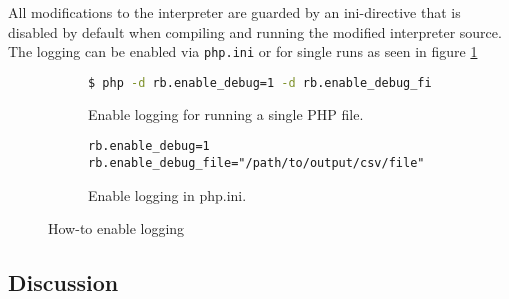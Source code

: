 All modifications to the interpreter are guarded by an ini-directive that is disabled by default when compiling and running the modified interpreter source. The logging can be enabled via \texttt{php.ini} or for single runs as seen in figure \ref{fig:iniDirective}

\begin{figure}[ht]
\centering
\begin{subfigure}{\linewidth}
\begin{lstlisting}[language=bash]
$ php -d rb.enable_debug=1 -d rb.enable_debug_file=<path-to-log-file> <path-to-php-file>
\end{lstlisting}
\caption{Enable logging for running a single PHP file.}
\end{subfigure}
\begin{subfigure}{\linewidth}
\begin{lstlisting}
rb.enable_debug=1
rb.enable_debug_file="/path/to/output/csv/file"
\end{lstlisting}
\caption{Enable logging in php.ini.}
\end{subfigure}
\caption{How-to enable logging}
\label{fig:iniDirective}
\end{figure}

\subsection{Discussion}
